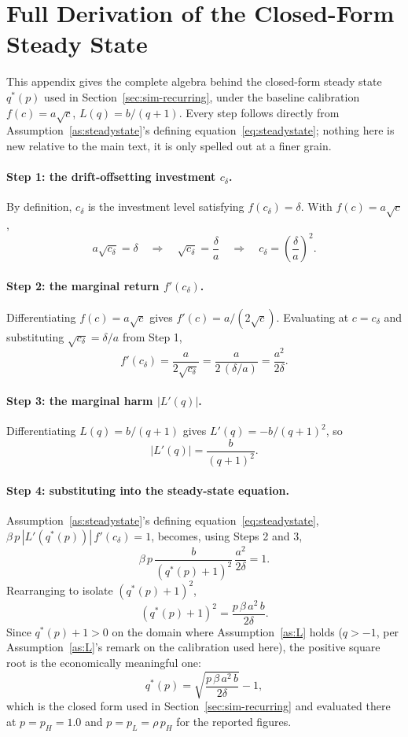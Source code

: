 \section{Full Derivation of the Closed-Form Steady State}
\label{app:derivation}

This appendix gives the complete algebra behind the closed-form steady state $q^*(p)$ used in Section~\ref{sec:sim-recurring}, under the baseline calibration $f(c) = a\sqrt{c}$, $L(q) = b/(q+1)$. Every step follows directly from Assumption~\ref{as:steadystate}'s defining equation~\eqref{eq:steadystate}; nothing here is new relative to the main text, it is only spelled out at a finer grain.

\paragraph{Step 1: the drift-offsetting investment $c_\delta$.} By definition, $c_\delta$ is the investment level satisfying $f(c_\delta) = \delta$. With $f(c) = a\sqrt{c}$,
\[
a\sqrt{c_\delta} = \delta \quad\Longrightarrow\quad \sqrt{c_\delta} = \frac{\delta}{a} \quad\Longrightarrow\quad c_\delta = \left(\frac{\delta}{a}\right)^2.
\]

\paragraph{Step 2: the marginal return $f'(c_\delta)$.} Differentiating $f(c)=a\sqrt{c}$ gives $f'(c) = a/(2\sqrt{c})$. Evaluating at $c=c_\delta$ and substituting $\sqrt{c_\delta}=\delta/a$ from Step 1,
\[
f'(c_\delta) = \frac{a}{2\sqrt{c_\delta}} = \frac{a}{2\,(\delta/a)} = \frac{a^2}{2\delta}.
\]

\paragraph{Step 3: the marginal harm $|L'(q)|$.} Differentiating $L(q) = b/(q+1)$ gives $L'(q) = -b/(q+1)^2$, so
\[
|L'(q)| = \frac{b}{(q+1)^2}.
\]

\paragraph{Step 4: substituting into the steady-state equation.} Assumption~\ref{as:steadystate}'s defining equation~\eqref{eq:steadystate}, $\beta\,p\,|L'(q^*(p))|\,f'(c_\delta) = 1$, becomes, using Steps 2 and 3,
\[
\beta\, p\, \frac{b}{(q^*(p)+1)^2}\, \frac{a^2}{2\delta} = 1.
\]
Rearranging to isolate $(q^*(p)+1)^2$,
\[
(q^*(p)+1)^2 = \frac{p\,\beta\,a^2\,b}{2\delta}.
\]
Since $q^*(p)+1 > 0$ on the domain where Assumption~\ref{as:L} holds ($q > -1$, per Assumption~\ref{as:L}'s remark on the calibration used here), the positive square root is the economically meaningful one:
\[
q^*(p) = \sqrt{\frac{p\,\beta\,a^2\,b}{2\delta}} - 1,
\]
which is the closed form used in Section~\ref{sec:sim-recurring} and evaluated there at $p=p_H=1.0$ and $p=p_L=\rho\,p_H$ for the reported figures.
